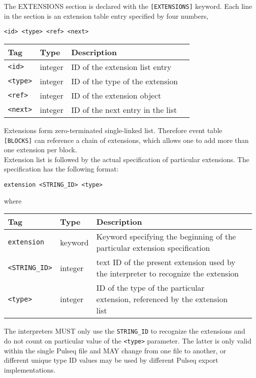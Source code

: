 \documentclass{article}
\begin{document}
The EXTENSIONS section is declared with the \verb.[EXTENSIONS]. keyword. Each line in the section is an extension table entry specified by four numbers,
\begin{lstlisting}
<id> <type> <ref> <next>
\end{lstlisting}

\begin{tabularx}{\textwidth}{llXl}
\toprule
Tag & Type & Description \\
\midrule
\verb.<id>. & integer & ID of the extension list entry \\
\verb.<type>. & integer & ID of the type of the extension \\
\verb.<ref>. & integer & ID of the extension object \\
\verb.<next>. & integer & ID of the next entry in the list \\
\bottomrule
\end{tabularx}

Extensions form zero-terminated single-linked list. Therefore event table \verb.[BLOCKS]. can reference a chain of extensions, which allows one to add more than one extension per block. \\

Extension list is followed by the actual specification of particular extensions. The specification has the following format:

\begin{lstlisting}
extension <STRING_ID> <type>
\end{lstlisting}

where 

\begin{tabularx}{\textwidth}{llXl}
\toprule
Tag & Type & Description \\
\midrule
\verb.extension. & keyword & Keyword specifying the beginning of the particular extension specification \\
\verb.<STRING_ID>. & integer & text ID of the present extension used by the interpreter to recognize the extension \\
\verb.<type>. & integer & ID of the type of the particular extension, referenced by the extension list \\
\bottomrule
\end{tabularx}

The interpreters MUST only use the \verb.STRING_ID. to recognize the extensions and do not count on particular value of the \verb.<type>. parameter. The latter is only valid within the single Pulseq file and MAY change from one file to another, or different unique type ID values may be used by different Pulseq export implementations.
\end{document}

